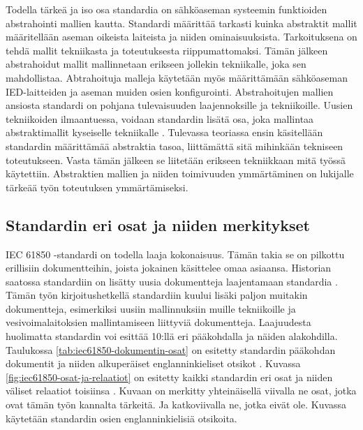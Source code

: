 Todella tärkeä ja iso osa standardia on sähköaseman systeemin funktioiden abstrahointi mallien kautta. Standardi määrittää tarkasti kuinka abstraktit mallit määritellään aseman oikeista laiteista ja niiden ominaisuuksista. Tarkoituksena on tehdä mallit tekniikasta ja toteutuksesta riippumattomaksi. Tämän jälkeen abstrahoidut mallit mallinnetaan erikseen jollekin tekniikalle, joka sen mahdollistaa. Abtrahoituja malleja käytetään myös määrittämään sähköaseman IED-laitteiden ja aseman muiden osien konfigurointi. Abstrahoitujen mallien ansiosta standardi on pohjana tulevaisuuden laajennoksille ja tekniikoille. Uusien tekniikoiden ilmaantuessa, voidaan standardin lisätä  osa, joka  mallintaa abstraktimallit kyseiselle tekniikalle \cite[s.~2]{Brunner2008}. Tulevassa teoriassa ensin käsitellään standardin määrittämää abstraktia tasoa, liittämättä sitä mihinkään tekniseen toteutukseen. Vasta tämän jälkeen se liitetään erikseen tekniikkaan mitä työssä käytettiin. Abstraktien mallien ja niiden toimivuuden ymmärtäminen on lukijalle tärkeää työn toteutuksen ymmärtämiseksi.


\subsection{Standardin eri osat ja niiden merkitykset}	
IEC 61850 -standardi on todella laaja kokonaisuus. Tämän takia se on pilkottu erillisiin dokumentteihin, joista jokainen käsittelee omaa asiaansa. Historian saatossa standardiin on lisätty uusia dokumentteja laajentamaan standardia \cite{IEC61850series, New-documents-by-IEC-TC-57} \cite[s.~13]{IEC61850-1}. Tämän työn kirjoitushetkellä standardiin kuului lisäki paljon muitakin dokumentteja, esimerkiksi uusiin mallinnuksiin muille tekniikoille ja vesivoimalaitoksien mallintamiseen liittyviä dokumentteja. Laajuudesta huolimatta standardin voi esittää 10:llä eri pääkohdalla ja näiden alakohdilla. Taulukossa \ref{tab:iec61850-dokumentin-osat} on esitetty standardin pääkohdan dokumentit ja niiden alkuperäiset englanninkieliset otsikot \cite[s.~2]{Mackiewicz2006} \cite{IEC61850series}. Kuvassa \ref{fig:iec61850-osat-ja-relaatiot} on esitetty kaikki standardin eri osat ja niiden väliset relaatiot toisiinsa \cite[s.~14]{IEC61850-7-1} \cite[s.~22]{IEC61850-1}. Kuvaan on merkitty yhteinäisellä viivalla ne osat, jotka ovat tämän työn kannalta tärkeitä. Ja katkoviivalla ne, jotka eivät ole. Kuvassa käytetään standardin osien englanninkielisiä otsikoita.

